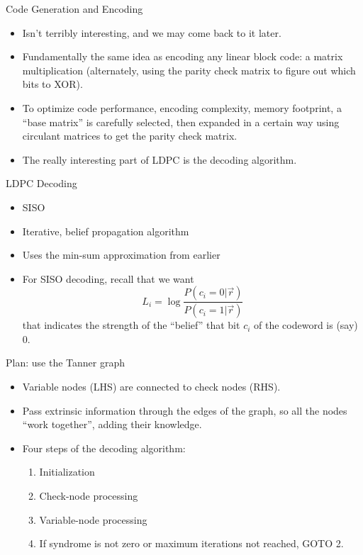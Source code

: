 \documentclass[aspectratio=1610, 10pt]{beamer}
\begin{document}
\begin{frame}[label={sec:org01dda87}]{Code Generation and Encoding}
\begin{itemize}
\item Isn't terribly interesting, and we may come back to it later.
\item Fundamentally the same idea as encoding any linear block code: a
matrix multiplication (alternately, using the parity check matrix to
figure out which bits to XOR).
\item To optimize code performance, encoding complexity, memory footprint,
a ``base matrix'' is carefully selected, then expanded in a certain
way using circulant matrices to get the parity check matrix.
\item The really interesting part of LDPC is the decoding algorithm.
\end{itemize}
\end{frame}


\begin{frame}[label={sec:org9eef026}]{LDPC Decoding}
\begin{itemize}
\item SISO
\item Iterative, belief propagation algorithm
\item Uses the min-sum approximation from earlier
\item For SISO decoding, recall that we want
$$L_i = \log{\frac{P(c_i=0|\vec{r})}{P(c_i=1|\vec{r})}}$$
that indicates the strength of the ``belief'' that bit \(c_i\) of the
codeword is (say) 0.
\end{itemize}
\end{frame}


\begin{frame}[label={sec:orgbb9138c}]{Plan: use the Tanner graph}
\begin{itemize}
\item Variable nodes (LHS) are connected to check nodes (RHS).
\item Pass extrinsic information through the edges of the graph, so all
the nodes ``work together'', adding their knowledge.
\item Four steps of the decoding algorithm:
\begin{enumerate}
\item Initialization
\item Check-node processing
\item Variable-node processing
\item If syndrome is not zero or maximum iterations not reached, GOTO 2.
\end{enumerate}
\end{itemize}
\end{frame}
\end{document}
